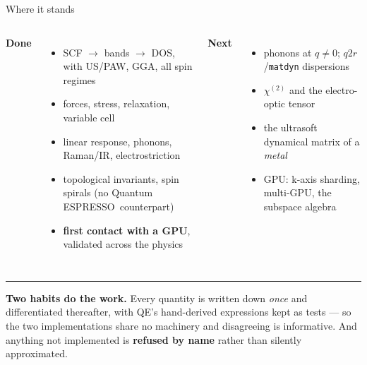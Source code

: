\documentclass[aspectratio=169,10pt]{beamer}
\newcommand{\qe}{Quantum ESPRESSO}
\begin{document}
\begin{frame}{Where it stands}
\small
\begin{columns}[T]
\textbf{Done}
\begin{itemize}\itemsep2pt
  \item SCF $\rightarrow$ bands $\rightarrow$ DOS, with US/PAW, GGA, all spin regimes
  \item forces, stress, relaxation, variable cell
  \item linear response, phonons, Raman/IR, electrostriction
  \item topological invariants, spin spirals (no \qe\ counterpart)
  \item \textbf{first contact with a GPU}, validated across the physics
\end{itemize}
\textbf{Next}
\begin{itemize}\itemsep2pt
  \item phonons at $q\neq0$; $q2r$/\texttt{matdyn} dispersions
  \item $\chi^{(2)}$ and the electro-optic tensor
  \item the ultrasoft dynamical matrix of a \emph{metal}
  \item GPU: k-axis sharding, multi-GPU, the subspace algebra
\end{itemize}
\end{columns}
\vspace{6pt}
\hrule
\vspace{5pt}
\footnotesize
\textbf{Two habits do the work.} Every quantity is written down \emph{once} and
differentiated thereafter, with QE's hand-derived expressions kept as tests ---
so the two implementations share no machinery and disagreeing is informative.
And anything not implemented is \textbf{refused by name} rather than silently
approximated.
\end{frame}
\end{document}
